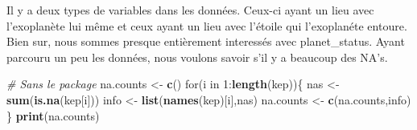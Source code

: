 \documentclass[]{article}
\newenvironment{Shaded}{\begin{snugshade}}{\end{snugshade}}
\newcommand{\KeywordTok}[1]{\textcolor[rgb]{0.13,0.29,0.53}{\textbf{{#1}}}}
\newcommand{\DecValTok}[1]{\textcolor[rgb]{0.00,0.00,0.81}{{#1}}}
\newcommand{\StringTok}[1]{\textcolor[rgb]{0.31,0.60,0.02}{{#1}}}
\newcommand{\CommentTok}[1]{\textcolor[rgb]{0.56,0.35,0.01}{\textit{{#1}}}}
\newcommand{\NormalTok}[1]{{#1}}
\begin{document}
Il y a deux types de variables dans les données. Ceux-ci ayant un lieu
avec l'exoplanète lui même et ceux ayant un lieu avec l'étoile qui
l'exoplanéte entoure. Bien sur, nous sommes presque entièrement
interessés avec planet\_status. Ayant parcouru un peu les données, nous
voulons savoir s'il y a beaucoup des NA's.

\begin{Shaded}
\begin{Highlighting}[]
\CommentTok{# Sans le package}
\NormalTok{na.counts <-}\StringTok{ }\KeywordTok{c}\NormalTok{()}
\NormalTok{for(i in }\DecValTok{1}\NormalTok{:}\KeywordTok{length}\NormalTok{(kep))\{}
  \NormalTok{nas <-}\StringTok{ }\KeywordTok{sum}\NormalTok{(}\KeywordTok{is.na}\NormalTok{(kep[i]))}
  \NormalTok{info <-}\StringTok{ }\KeywordTok{list}\NormalTok{(}\KeywordTok{names}\NormalTok{(kep)[i],nas)}
  \NormalTok{na.counts <-}\StringTok{ }\KeywordTok{c}\NormalTok{(na.counts,info)}
\NormalTok{\}}
\KeywordTok{print}\NormalTok{(na.counts)}
\end{Highlighting}
\end{Shaded}
\end{document}
